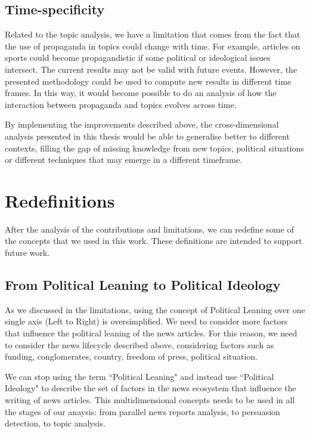 \subsection{Time-specificity}
Related to the topic analysis, we have a limitation that comes from the fact that the use of propaganda in topics could change with time. %
For example, articles on sports could become propagandistic if some political or ideological issues intersect. %
The current results may not be valid with future events.
However, the presented methodology could be used to compute new results in different time frames.
In this way, it would become possible to do an analysis of how the interaction between propaganda and topics evolves across time.


By implementing the improvements described above, the cross-dimensional analysis presented in this thesis would be able to generalise better to different contexts, filling the gap of missing knowledge from new topics, political situations or different techniques that may emerge in a different timeframe.



\section{Redefinitions}


After the analysis of the contributions and limitations, we can redefine some of the concepts that we used in this work. These definitions are intended to support future work.


\subsection{From Political Leaning to Political Ideology}

As we discussed in the limitations, using the concept of Political Leaning over one single axis (Left to Right) is oversimplified.
We need to consider more factors that influence the political leaning of the news articles.
For this reason, we need to consider the news lifecycle described above, considering factors such as funding, conglomerates, country, freedom of press, political situation.

We can stop using the term ``Political Leaning" and instead use ``Political Ideology" to describe the set of factors in the news ecosystem that influence the writing of news articles.
This multidimensional concepts needs to be used in all the stages of our anaysis: from parallel news reports analysis, to persuasion detection, to topic analysis.

